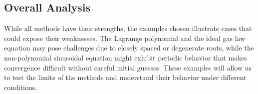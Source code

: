 \documentclass[12pt]{article}
\begin{document}
\subsection*{Overall Analysis}

While all methods have their strengths, the examples chosen illustrate cases that could expose their weaknesses. The Lagrange polynomial and the ideal gas law equation may pose challenges due to closely spaced or degenerate roots, while the non-polynomial sinusoidal equation might exhibit periodic behavior that makes convergence difficult without careful initial guesses. These examples will allow us to test the limits of the methods and understand their behavior under different conditions.
\end{document}
